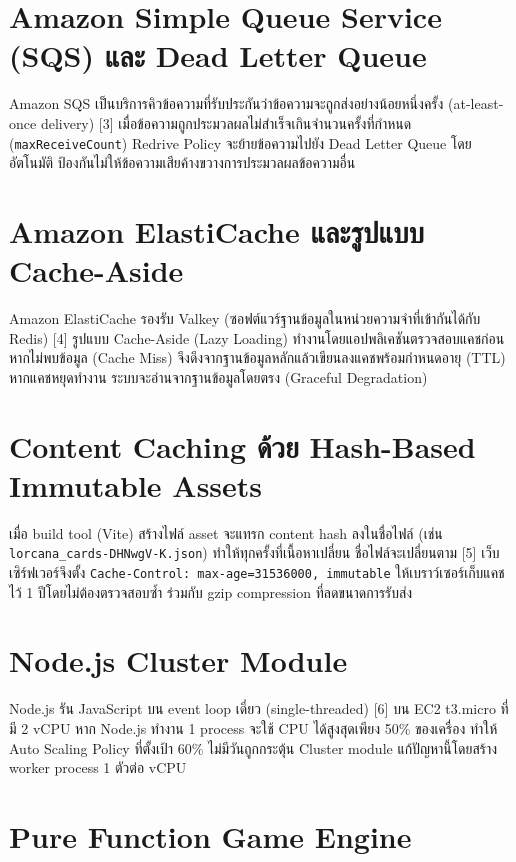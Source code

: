 \documentclass[12pt,a4paper]{report}
\begin{document}
\section{Amazon Simple Queue Service (SQS) และ Dead Letter Queue}

Amazon SQS เป็นบริการคิวข้อความที่รับประกันว่าข้อความจะถูกส่งอย่างน้อยหนึ่งครั้ง (at-least-once delivery) [3] เมื่อข้อความถูกประมวลผลไม่สำเร็จเกินจำนวนครั้งที่กำหนด (\texttt{maxReceiveCount}) Redrive Policy จะย้ายข้อความไปยัง Dead Letter Queue โดยอัตโนมัติ ป้องกันไม่ให้ข้อความเสียค้างขวางการประมวลผลข้อความอื่น

\section{Amazon ElastiCache และรูปแบบ Cache-Aside}

Amazon ElastiCache รองรับ Valkey (ซอฟต์แวร์ฐานข้อมูลในหน่วยความจำที่เข้ากันได้กับ Redis) [4] รูปแบบ Cache-Aside (Lazy Loading) ทำงานโดยแอปพลิเคชันตรวจสอบแคชก่อน หากไม่พบข้อมูล (Cache Miss) จึงดึงจากฐานข้อมูลหลักแล้วเขียนลงแคชพร้อมกำหนดอายุ (TTL) หากแคชหยุดทำงาน ระบบจะอ่านจากฐานข้อมูลโดยตรง (Graceful Degradation)

\section{Content Caching ด้วย Hash-Based Immutable Assets}

เมื่อ build tool (Vite) สร้างไฟล์ asset จะแทรก content hash ลงในชื่อไฟล์ (เช่น \nolinkurl{lorcana_cards-DHNwgV-K.json}) ทำให้ทุกครั้งที่เนื้อหาเปลี่ยน ชื่อไฟล์จะเปลี่ยนตาม [5] เว็บเซิร์ฟเวอร์จึงตั้ง \texttt{Cache-Control: max-age=31536000, immutable} ให้เบราว์เซอร์เก็บแคชไว้ 1 ปีโดยไม่ต้องตรวจสอบซ้ำ ร่วมกับ gzip compression ที่ลดขนาดการรับส่ง

\section{Node.js Cluster Module}

Node.js รัน JavaScript บน event loop เดี่ยว (single-threaded) [6] บน EC2 t3.micro ที่มี 2 vCPU หาก Node.js ทำงาน 1 process จะใช้ CPU ได้สูงสุดเพียง 50\% ของเครื่อง ทำให้ Auto Scaling Policy ที่ตั้งเป้า 60\% ไม่มีวันถูกกระตุ้น Cluster module แก้ปัญหานี้โดยสร้าง worker process 1 ตัวต่อ vCPU

\section{Pure Function Game Engine}
\end{document}
